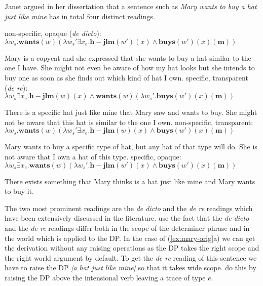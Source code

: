 \documentclass[parskip=half]{scrartcl}
\begin{document}
Janet \cite{fodor1970} argued in her dissertation that a sentence such as \textit{Mary wants to buy a hat just like mine} has in total four distinct readings. 
\begin{exe}
\ex \label{ex:mary-orig} \begin{xlist} 
\ex non-specific, opaque (\textit{de dicto}): \\ $\lambda w_s. \mathbf{wants}(w)(\lambda w_s' \exists x_e. \mathbf{h-jlm}(w')(x) \land \mathbf{buys}(w')(x)(\mathbf{m}))$

Mary is a copycat and she expressed that she wants to buy a hat similar to the one I have. She might not even be aware
of how my hat looks but she intends to buy one as soon as she finds out which kind of hat I own.
\ex specific, transparent (\textit{de re}): \\ $\lambda w_s \exists x_e. \mathbf{h-jlm}(w)(x) \land \mathbf{wants}(w)(\lambda w_s'. \mathbf{buys}(w')(x)(\mathbf{m}))$

There is a specific hat just like mine that Mary saw and wants to buy. She might not be aware that this hat is similar to the one I own.
\ex non-specific, transparent: \\ $\lambda w_s. \mathbf{wants}(w)(\lambda w_s' \exists x_e. \mathbf{h-jlm}(w)(x) \land \mathbf{buys}(w')(x)(\mathbf{m}))$

Mary wants to buy a specific type of hat, but any hat of that type will do. She is not aware that I own a hat of this type.
\ex specific, opaque: \\
$\lambda w_s  \exists x_e. \mathbf{wants}(w)(\lambda w_s'. \mathbf{h-jlm}(w')(x) \land \mathbf{buys}(w')(x)(\mathbf{m}))$

There exists something that Mary thinks is a hat just like mine and Mary wants to buy it. 
\end{xlist}
\end{exe}


The two most prominent readings are the \textit{de dicto} and the \textit{de re} readings which have been extensively discussed in the literature.
\citet[Ch. 7]{Fintel2002} use the fact that the \textit{de dicto} and the \textit{de re} readings differ both in the scope of the determiner phrase and in the world 
which is applied to the DP. In the case of (\ref{ex:mary-orig}a) we can get the derivation without any raising operations as the DP takes the
right scope and the right world argument by default. To get the \textit{de re} reading of this sentence we have to raise the DP \textit{[a hat just like mine]} so that it takes wide scope. 
\cite{Fintel2002} do this by raising the DP above the intensional verb leaving a trace of type $e$.
\end{document}
